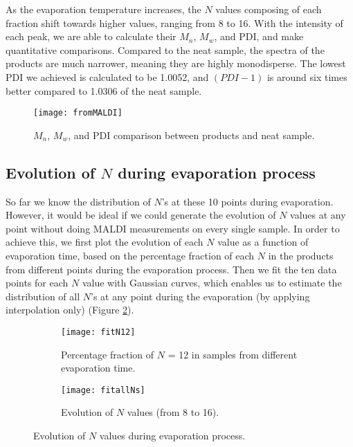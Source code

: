 As the evaporation temperature increases, the $N$ values composing of each fraction shift towards higher values, ranging from 8 to 16. With the intensity of each peak, we are able to calculate their $M_{n}$, $M_{w}$, and PDI, and make quantitative comparisons. Compared to the neat sample, the spectra of the products are much narrower, meaning they are highly monodisperse. The lowest PDI we achieved is calculated to be 1.0052, and $(PDI - 1)$ is around six times better compared to 1.0306 of the neat sample.

\begin{figure}[H]
\center
\texttt{[image: fromMALDI]}
\caption{$M_{n}$, $M_{w}$, and PDI comparison between products and neat sample.}
\label{fig:fromMALDI}
\end{figure}

\subsection{Evolution of $N$ during evaporation process}

So far we know the distribution of $N$'s at these 10 points during evaporation. However, it would be ideal if we could generate the evolution of $N$ values at any point without doing MALDI measurements on every single sample. In order to achieve this, we first plot the evolution of each $N$ value as a function of evaporation time, based on the percentage fraction of each $N$ in the products from different points during the evaporation process. Then we fit the ten data points for each $N$ value with Gaussian curves, which enables us to estimate the distribution of all $N$'s at any point during the evaporation (by applying interpolation only) (Figure \ref{fig:Nevolution}).

\begin{figure}[H]
  \centering
  \begin{subfigure}[b]{0.6\linewidth}
    \texttt{[image: fitN12]}
    \caption{Percentage fraction of $N$ = 12 in samples from different evaporation time.}
    \vspace{1 cm}
  \end{subfigure}
  \begin{subfigure}[b]{0.6\linewidth}
    \texttt{[image: fitallNs]}
    \caption{Evolution of $N$ values (from 8 to 16).}
  \end{subfigure}
  \caption{Evolution of $N$ values during evaporation process.}
  \label{fig:Nevolution}
\end{figure}